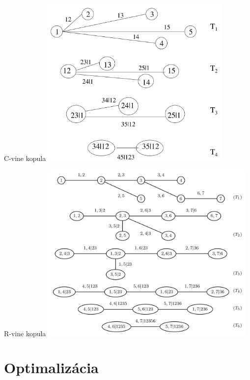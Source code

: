 \documentclass{Bredelebeamer}
\begin{document}
\begin{frame}{C-vine kopula}
	\centering
	\includegraphics[width=0.7\textwidth]{Figures/c-vine}
\end{frame}

\begin{frame}{R-vine kopula}
	\centering
	\includegraphics[width=0.8\textwidth]{Figures/r-vine}
\end{frame}

\section{Optimalizácia}
\end{document}
